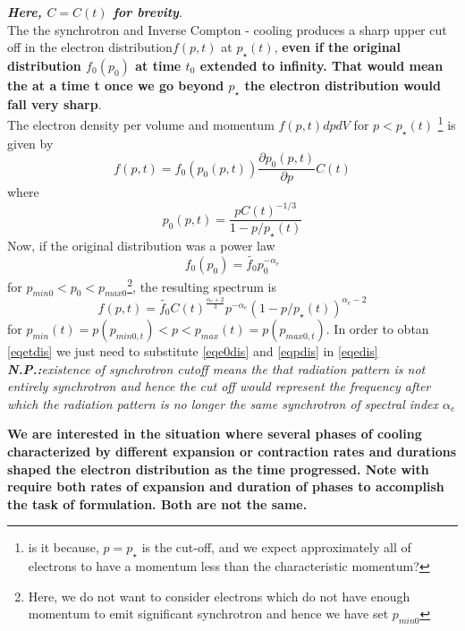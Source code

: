\documentclass[11pt]{report}
\newcommand{\tbf}[1]{\textbf{#1}}
\newcommand{\tit}[1]{\textit{#1}}
\newcommand{\fn}[1]{\footnote{#1}}
\newcommand{\pe}[2]{\frac{\partial{#1}}{\partial{#2}}}
\newcommand{\cc}[1]{\left({#1}\right)}
\begin{document}
\tbf{\tit{Here, $C=C(t)$ for brevity}}. \\

The the synchrotron and Inverse Compton - cooling produces a sharp upper cut off in the electron distribution$f(p,t)$ at $p_\star(t)$, \tbf{even if the original distribution $f_0(p_0)$ at time $t_0$ extended to infinity. That would mean the at a time t once we go beyond $p_\star$ the electron distribution would fall very sharp}.\\

The electron density per volume and momentum $f(p,t)dpdV$ for $p<p_\star(t)$ \fn{is it because, $p=p_\star$ is the cut-off, and we expect approximately all of electrons to have a momentum less than the characteristic momentum?} is given by
\begin{equation}\label{eqedis}
f(p,t)=f_0(p_0(p,t))\pe{p_0(p,t)}{p}C(t)
\end{equation}
where 
\begin{equation}\label{eqpdis}
p_0(p,t)=\frac{pC(t)^{-1/3}}{1-p/p_\star(t)}
\end{equation}
Now, if the original distribution was a power law
\begin{equation}\label{eqe0dis}
f_0(p_0)=\tilde{f_0}p^{-\alpha_e} _0
\end{equation}
for $p_{min0}<p_{0}<p_{max0}$\fn{Here, we do not want to consider electrons which do not have enough momentum to emit significant synchrotron and hence we have set $p_{min0}$ }, the resulting spectrum is 
\begin{equation}\label{eqetdis}
f(p,t)=\tilde{f_0}C(t)^{\frac{\alpha_e +2}{3}} p^{-\alpha_e}\cc{1-p/p_\star(t)}^{\alpha_e-2}
\end{equation}
for $p_{min}(t)=p(p_{min0,t})<p<p_{max}(t)=p(p_{max0,t})$. In order to obtan \eqref{eqetdis} we just need to substitute \eqref{eqe0dis} and \eqref{eqpdis} in \eqref{eqedis} \\

\tit{\tbf{N.P.:}existence of synchrotron cutoff means the that radiation pattern is not entirely synchrotron and hence  the cut off would represent the frequency after which the radiation pattern is no longer the same synchrotron of spectral index $\alpha_e$ }

\tbf{We are interested in the situation where several phases of cooling characterized by different expansion or contraction rates and durations shaped the electron distribution as the time progressed. Note with require both rates of expansion and duration of phases to accomplish the task of formulation. Both are not the same.}\\
\end{document}
